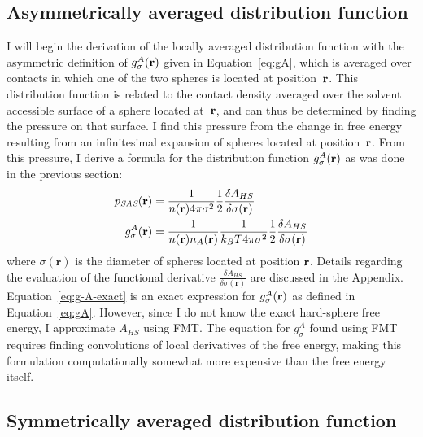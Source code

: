 \subsection{Asymmetrically averaged distribution function}\label{sec:g-A}

I will begin the derivation of the locally averaged distribution
function with the asymmetric definition of $g_\sigma^A(\textbf{r})$ given in
Equation~\ref{eq:gA}, which is averaged over contacts in which one of
the two spheres is located at position~$\textbf{r}$.  This distribution
function is related to the contact density averaged over the solvent accessible surface
of a sphere located at~$\textbf{r}$, and can thus be determined by finding
the pressure on that surface.  I find this pressure from the change in
free energy resulting from an infinitesimal expansion of spheres
located at position~$\textbf{r}$.  From this pressure, I derive a
formula for the distribution function $g_\sigma^A(\textbf{r})$ as was done in
the previous section:
\begin{align}
  p_{\textit{SAS}}(\mathbf{r}) &= \frac{1}{n(\rr) 4\pi \sigma^2}\frac12 \frac{\delta
    A_{HS}}{\delta \sigma(\mathbf{r})} \label{eq:p_{HS}^A}\\
  g_\sigma^A(\rr)%
  &= \frac{1}{n(\rr) n_A(\rr)}\frac{1}{ k_BT 4\pi \sigma^2}\frac12 \frac{\delta
    A_{HS}}{\delta \sigma(\mathbf{r})} \label{eq:g-A-exact}
\end{align}
where $\sigma(\mathbf{r})$ is the diameter of spheres located at position $\textbf{r}$.
Details regarding the evaluation of the functional derivative
$\frac{\delta A_{HS}}{\delta \sigma(\mathbf{r})}$
are discussed in the Appendix.
Equation~\ref{eq:g-A-exact} is an exact expression for
$g_\sigma^A(\textbf{r})$ as defined in Equation~\ref{eq:gA}.  However, since
I do not know the exact hard-sphere free energy, I approximate
$A_{HS}$ using FMT.
The equation for $g_\sigma^A$ found using FMT requires finding
convolutions of local derivatives of the free energy, making this
formulation computationally somewhat more expensive than the free
energy itself.

\derivation{
  \end{widetext}
}

\subsection{Symmetrically averaged distribution function}\label{sec:g-S}

